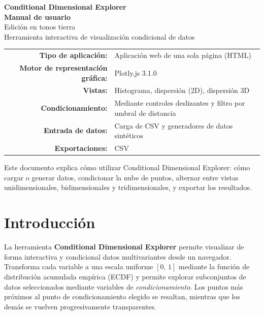 \documentclass[11pt,a4paper]{article}
\begin{document}
\begin{titlepage}
\centering
\vspace*{3cm}

{\Huge\bfseries\color{accent} Conditional Dimensional Explorer}\\[0.4cm]
{\LARGE\bfseries Manual de usuario}\\[1.5cm]

{\large Edición en tonos tierra}\\[0.3cm]
{\large Herramienta interactiva de visualización condicional de datos}\\[3cm]

\begin{tabular}{rl}
\textbf{Tipo de aplicación:} & Aplicación web de una sola página (HTML) \\
\textbf{Motor de representación gráfica:} & Plotly.js 3.1.0 \\
\textbf{Vistas:} & Histograma, dispersión (2D), dispersión 3D \\
\textbf{Condicionamiento:} & Mediante controles deslizantes y filtro por umbral de distancia \\
\textbf{Entrada de datos:} & Carga de CSV y generadores de datos sintéticos \\
\textbf{Exportaciones:} & CSV \\
\end{tabular}

\vfill

{\small Este documento explica cómo utilizar Conditional Dimensional Explorer: cómo cargar o generar datos, condicionar la nube de puntos, alternar entre vistas unidimensionales, bidimensionales y tridimensionales, y exportar los resultados.}

\end{titlepage}

\tableofcontents
\newpage

\section{Introducción}

La herramienta \textbf{Conditional Dimensional Explorer} permite visualizar de forma interactiva y condicional datos multivariantes desde un navegador. Transforma cada variable a una escala uniforme $[0,\,1]$ mediante la función de distribución acumulada empírica (ECDF) y permite explorar subconjuntos de datos seleccionados mediante variables de \emph{condicionamiento}. Los puntos más próximos al punto de condicionamiento elegido se resaltan, mientras que los demás se vuelven progresivamente transparentes.
\end{document}
